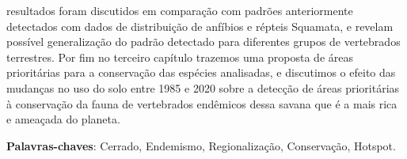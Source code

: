 \documentclass[12pt,openright,oneside,a4paper,english]{abntex2}
\begin{document}
\begin{resumo}[Resumo]
resultados foram discutidos em comparação com padrões anteriormente detectados com dados de distribuição de anfíbios e répteis Squamata, e revelam possível generalização do padrão detectado para diferentes grupos de vertebrados terrestres. Por fim no terceiro capítulo trazemos uma proposta de áreas prioritárias para a conservação das espécies analisadas, e discutimos o efeito das mudanças no uso do solo entre 1985 e 2020 sobre a detecção de áreas prioritárias à conservação da fauna de vertebrados endêmicos dessa savana que é a mais rica e ameaçada do planeta.
	\vspace{\onelineskip}
	\noindent
	
	\textbf{Palavras-chaves}: Cerrado, Endemismo, Regionalização, Conservação, Hotspot.
\end{resumo}

\end{document}
